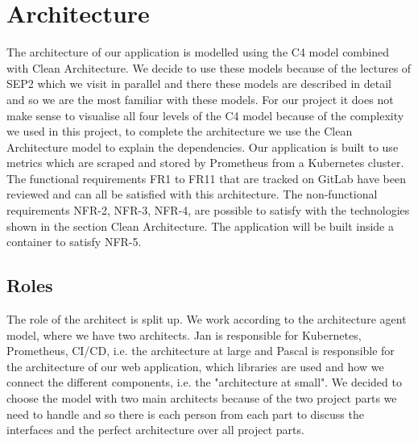 \chapter{Architecture}

    

The architecture of our application is modelled using the C4 model combined with Clean Architecture. We decide to use these models because of the lectures of SEP2 which we visit in parallel and there these models are described in detail and so we are the most familiar with these models. For our project it does not make sense to visualise all four levels of the C4 model because of the complexity we used in this project, to complete the architecture we use the Clean Architecture model to explain the dependencies.
Our application is built to use metrics which are scraped and stored by Prometheus from a Kubernetes cluster.
The functional requirements FR1 to FR11 that are tracked on GitLab have been reviewed and can all be satisfied with this architecture. 
The non-functional requirements NFR-2, NFR-3, NFR-4, are possible to satisfy with the technologies shown in the section Clean Architecture.
The application will be built inside a container to satisfy NFR-5.

\section{Roles}
The role of the architect is split up. We work according to the architecture agent model, where we have two architects.
Jan is responsible for Kubernetes, Prometheus, CI/CD, i.e. the architecture at large
and Pascal is responsible for the architecture of our web application, which libraries are used and how we connect the different components, i.e. the "architecture at small". We decided to choose the model with two main architects because of the two project parts we need to handle and so there is each person from each part to discuss the interfaces and the perfect architecture over all project parts.

